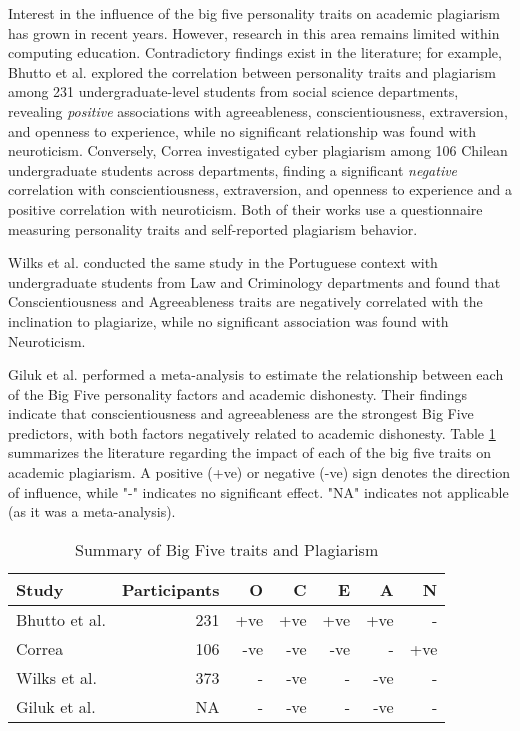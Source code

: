 Interest in the influence of the big five personality traits on academic plagiarism has grown in recent years. However, research in this area remains limited within computing education. Contradictory findings exist in the literature; for example, Bhutto et al. \cite{Bhutto2019ACS} explored the correlation between personality traits and plagiarism among 231 undergraduate-level students from social science departments, revealing \textit{positive} associations with agreeableness, conscientiousness, extraversion, and openness to experience, while no significant relationship was found with neuroticism. Conversely, Correa \cite{ChileanUniver} investigated cyber plagiarism among 106 Chilean undergraduate students across departments, finding a significant \textit{negative} correlation with conscientiousness, extraversion, and openness to experience and a positive correlation with neuroticism. Both of their works use a questionnaire measuring personality traits and self-reported plagiarism behavior.

Wilks et al. \cite{Wilks2016-WILPTA-3} conducted the same study in the Portuguese context with undergraduate students from Law and Criminology departments and found that Conscientiousness and Agreeableness traits are negatively correlated with the inclination to plagiarize, while no significant association was found with Neuroticism. 

Giluk et al.\cite{Giluk2015BigFP} performed a meta-analysis to estimate the relationship between each of the Big Five personality factors and academic dishonesty. Their findings indicate that conscientiousness and agreeableness are the strongest Big Five predictors, with both factors negatively related to academic dishonesty. Table \ref{tab:litSUmmary} summarizes the literature regarding the impact of each of the big five traits on academic plagiarism. A positive (+ve) or negative (-ve) sign denotes the direction of influence, while "-" indicates no significant effect. "NA" indicates not applicable (as it was a meta-analysis). 

\vspace{-8pt}
\begin{table}[H]
  \centering
  \caption{Summary of Big Five traits and Plagiarism\\\label{tab:litSUmmary}}
    \vspace{-12pt}
  \begin{tabular}{p{2cm}rrrrrr}
    \toprule
    Study & Participants & O & C & E & A & N \\\midrule
    Bhutto et al.\cite{Bhutto2019ACS} & 231 & +ve & +ve & +ve & +ve & - \\
    Correa\cite{ChileanUniver} & 106 & -ve & -ve & -ve & - & +ve \\
    Wilks et al.\cite{Wilks2016-WILPTA-3} & 373 & - & -ve & - & -ve & - \\
    Giluk et al.\cite{Giluk2015BigFP} & NA & - & -ve & - & -ve & - \\ \bottomrule
  \end{tabular}
  \vspace{-8pt}
\end{table}

